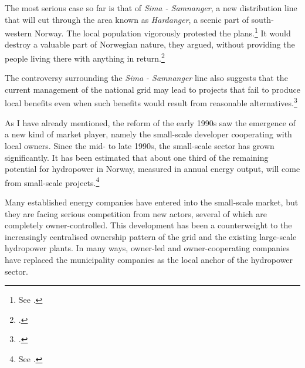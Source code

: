 The most serious case so far is that of {\it Sima - Samnanger}, a new distribution line that will cut through the area known as {\it Hardanger}, a scenic part of south-western Norway. The local population vigorously protested the plans.\footnote{See \cite[22-23]{brekke12}.} It would destroy a valuable part of Norwegian nature, they argued, without providing the people living there with anything in return.\footcite[26-27]{brekke12} %

The controversy surrounding the {\it Sima - Samnanger} line also suggests that the current management of the national grid may lead to projects that fail to produce local benefits even when such benefits would result from reasonable alternatives.\footcite[27]{brekke12} 

As I have already mentioned, the reform of the early 1990s saw the emergence of a new kind of market player, namely the small-scale developer cooperating with local owners. Since the mid- to late 1990s, the small-scale sector has grown significantly. It has been estimated that about one third of the remaining potential for hydropower in Norway, measured in annual energy output, will come from small-scale projects.\footnote{See \cite[231]{nou129}.}

Many established energy companies have entered into the small-scale market, but they are facing serious competition from new actors, several of which are completely owner-controlled. This development has been a counterweight to the increasingly centralised ownership pattern of the grid and the existing large-scale hydropower plants. In many ways, owner-led and owner-cooperating companies have replaced the municipality companies as the local anchor of the hydropower sector. 

